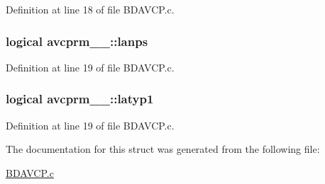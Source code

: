 Definition at line 18 of file B\+D\+A\+V\+C\+P.\+c.

\subsubsection[{\texorpdfstring{lanps}{lanps}}]{\setlength{\rightskip}{0pt plus 5cm}logical avcprm\+\_\+\_\+\+::lanps}\hypertarget{structavcprm__1___a40d76c824e2159cdbfb51f40cefeef5c}{}\label{structavcprm__1___a40d76c824e2159cdbfb51f40cefeef5c}


Definition at line 19 of file B\+D\+A\+V\+C\+P.\+c.

\subsubsection[{\texorpdfstring{latyp1}{latyp1}}]{\setlength{\rightskip}{0pt plus 5cm}logical avcprm\+\_\+\_\+\+::latyp1}\hypertarget{structavcprm__1___a835c7eb09f62523bf129afee6e2e5a24}{}\label{structavcprm__1___a835c7eb09f62523bf129afee6e2e5a24}


Definition at line 19 of file B\+D\+A\+V\+C\+P.\+c.



The documentation for this struct was generated from the following file\+:\begin{DoxyCompactItemize}
\item 
\hyperlink{BDAVCP_8c}{B\+D\+A\+V\+C\+P.\+c}\end{DoxyCompactItemize}
